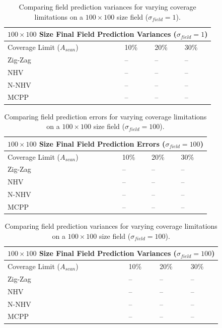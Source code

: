 \begin{table}[ht!]
\centering
  \begin{tabular}{ |p{3cm}||p{1cm}|p{1cm}|p{1cm}|  }
      \hline
      \multicolumn{4}{|c|}{$100 \times 100$ Size Final Field Prediction Variances ($\sigma_{field} = 1$)} \\
      \hline
      Coverage Limit ($A_{scan}$) & 10\% & 20\% & 30\% \\
      \hline
      Zig-Zag        & -- & -- & -- \\
      NHV            & -- & -- & -- \\
      N-NHV          & -- & -- & -- \\
      MCPP           & -- & -- & -- \\
      \hline
  \end{tabular}
  \caption{Comparing field prediction variances for varying coverage limitations on a $100 \times 100$ size field ($\sigma_{field} = 1$).}
\end{table}

\begin{table}[ht!]
\centering
  \begin{tabular}{ |p{3cm}||p{1cm}|p{1cm}|p{1cm}|  }
      \hline
      \multicolumn{4}{|c|}{$100 \times 100$ Size Final Field Prediction Errors ($\sigma_{field} = 100$)} \\
      \hline
      Coverage Limit ($A_{scan}$) & 10\% & 20\% & 30\% \\
      \hline
      Zig-Zag        & -- & -- & -- \\
      NHV            & -- & -- & -- \\
      N-NHV          & -- & -- & -- \\
      MCPP           & -- & -- & -- \\
      \hline
  \end{tabular}
  \caption{Comparing field prediction errors for varying coverage limitations on a $100 \times 100$ size field ($\sigma_{field} = 100$).}
\end{table}

\begin{table}[ht!]
\centering
  \begin{tabular}{ |p{3cm}||p{1cm}|p{1cm}|p{1cm}|  }
      \hline
      \multicolumn{4}{|c|}{$100 \times 100$ Size Final Field Prediction Variances ($\sigma_{field} = 100$)} \\
      \hline
      Coverage Limit ($A_{scan}$) & 10\% & 20\% & 30\% \\
      \hline
      Zig-Zag        & -- & -- & -- \\
      NHV            & -- & -- & -- \\
      N-NHV          & -- & -- & -- \\
      MCPP           & -- & -- & -- \\
      \hline
  \end{tabular}
  \caption{Comparing field prediction variances for varying coverage limitations on a $100 \times 100$ size field ($\sigma_{field} = 100$).}
\end{table}
